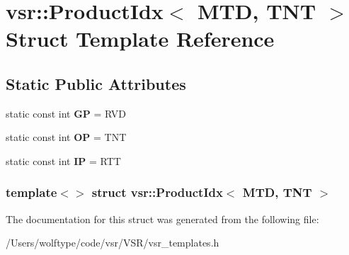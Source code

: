\hypertarget{structvsr_1_1_product_idx_3_01_m_t_d_00_01_t_n_t_01_4}{\section{vsr\-:\-:Product\-Idx$<$ M\-T\-D, T\-N\-T $>$ Struct Template Reference}
\label{structvsr_1_1_product_idx_3_01_m_t_d_00_01_t_n_t_01_4}
}
\subsection*{Static Public Attributes}
\begin{DoxyCompactItemize}
\item 
\hypertarget{structvsr_1_1_product_idx_3_01_m_t_d_00_01_t_n_t_01_4_a67b1258278924d3d153511893bb8cf7d}{static const int {\bfseries G\-P} = R\-V\-D}\label{structvsr_1_1_product_idx_3_01_m_t_d_00_01_t_n_t_01_4_a67b1258278924d3d153511893bb8cf7d}

\item 
\hypertarget{structvsr_1_1_product_idx_3_01_m_t_d_00_01_t_n_t_01_4_a4305dc0719fcd7919314baaeef36c88f}{static const int {\bfseries O\-P} = T\-N\-T}\label{structvsr_1_1_product_idx_3_01_m_t_d_00_01_t_n_t_01_4_a4305dc0719fcd7919314baaeef36c88f}

\item 
\hypertarget{structvsr_1_1_product_idx_3_01_m_t_d_00_01_t_n_t_01_4_a12ce0c5dc62d61e0eb728e8b260b12d2}{static const int {\bfseries I\-P} = R\-T\-T}\label{structvsr_1_1_product_idx_3_01_m_t_d_00_01_t_n_t_01_4_a12ce0c5dc62d61e0eb728e8b260b12d2}

\end{DoxyCompactItemize}
\subsubsection*{template$<$$>$ struct vsr\-::\-Product\-Idx$<$ M\-T\-D, T\-N\-T $>$}



The documentation for this struct was generated from the following file\-:\begin{DoxyCompactItemize}
\item 
/\-Users/wolftype/code/vsr/\-V\-S\-R/vsr\-\_\-templates.\-h\end{DoxyCompactItemize}
